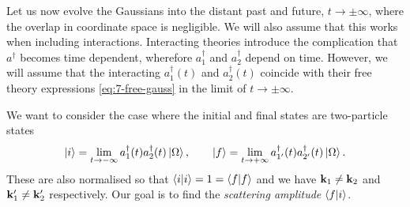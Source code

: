 Let us now evolve the Gaussians into the distant past and future, $t \to \pm \infty$, where the overlap in coordinate space is negligible.
We will also assume that this works when including interactions. Interacting theories introduce the complication that $a^{\dagger}$ becomes time dependent, wherefore $a_1^{\dagger}$ and $a_2^{\dagger}$ depend on time.
However, we will assume that the interacting $a_1^{\dagger}(t)$ and $a_2^{\dagger}(t)$ coincide with their free theory expressions \eqref{eq:7-free-gauss} in the limit of $t \to \pm \infty$.

We want to consider the case where the initial and final states are two-particle states
\begin{equation}
  \ket{i} = \lim_{t \to -\infty} a_1^{\dagger}(t) a_2^{\dagger}(t) \ket{\Omega}, \qquad
  \ket{f} =\lim_{t \to +\infty}  a_{1'}^{\dagger}(t) a_{2'}^{\dagger}(t) \ket{\Omega}.
\end{equation}
These are also normalised so that $\bra{i}\ket{i} = 1 = \bra{f}\ket{f}$ and we have $\vb{k}_1 \neq \vb{k}_2$ and $\vb{k}_1' \neq \vb{k}_2'$ respectively.
Our goal is to find the \emph{scattering amplitude} $\bra{f}\ket{i}$.

